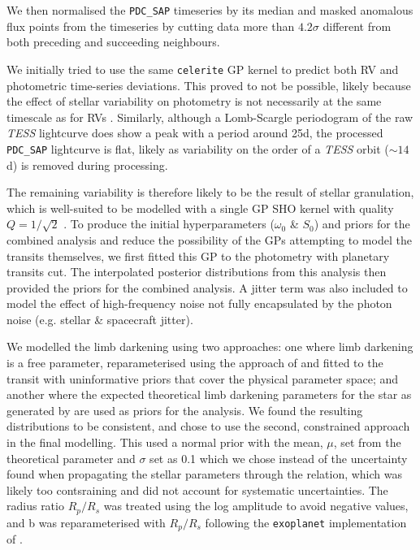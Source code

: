\documentclass[fleqn,usenatbib]{mnras}
\newcommand{\tess}{{\it TESS}}
\begin{document}
We then normalised the \texttt{PDC\_SAP} timeseries by its median and masked anomalous flux points from the timeseries by cutting data more than $4.2\sigma$ different from both preceding and succeeding neighbours.

We initially tried to use the same \texttt{celerite} GP kernel to predict both RV and photometric time-series deviations.
This proved to not be possible, likely because the effect of stellar variability on photometry is not necessarily at the same timescale as for RVs \citep{10.1111/j.1365-2966.2011.19960.x}.
Similarly, although a Lomb-Scargle periodogram of the raw \tess{} lightcurve does show a peak with a period around 25d, the processed \texttt{PDC\_SAP} lightcurve is flat, likely as variability on the order of a \tess{} orbit ($\sim 14$\,d) is removed during processing.

The remaining variability is therefore likely to be the result of stellar granulation, which is well-suited to be modelled with a single GP SHO kernel with quality $Q=1/\sqrt{2}$ \citep{2020A&A...634A..75B, exoplanet:foremanmackey17}.
To produce the initial hyperparameters ($\omega_0$ \& $S_0$) and priors for the combined analysis and reduce the possibility of the GPs attempting to model the transits themselves, we first fitted this GP to the photometry with planetary transits cut. 
The interpolated posterior distributions from this analysis then provided the priors for the combined analysis.
A jitter term was also included to model the effect of high-frequency noise not fully encapsulated by the photon noise (e.g. stellar \& spacecraft jitter).

We modelled the limb darkening using two approaches: one where limb darkening is a free parameter, reparameterised using the approach of \citet{kipping2013efficient} and fitted to the transit with uninformative priors that cover the physical parameter space; and another where the expected theoretical limb darkening parameters for the star as generated by \citet{claret2017limb} are used as priors for the analysis.
We found the resulting distributions to be consistent, and chose to use the second, constrained approach in the final modelling. 
This used a normal prior with the mean, $\mu$, set from the theoretical parameter and $\sigma$ set as 0.1 which we chose instead of the uncertainty found when propagating the stellar parameters through the \citet{claret2017limb} relation, which was likely too contsraining and did not account for systematic uncertainties.
The radius ratio $R_p/R_s$ was treated using the log amplitude to avoid negative values, and b was reparameterised with $R_p/R_s$ following the \texttt{exoplanet} implementation of \citet{espinoza2018efficient}.
\end{document}
